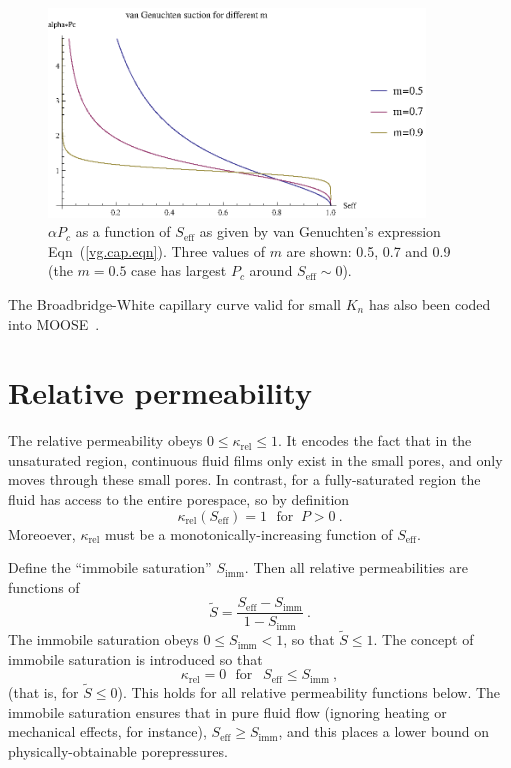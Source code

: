 \documentclass[]{scrreprt}
\begin{document}
\begin{figure}[htb]
\centering
\includegraphics[width=10cm]{van_genuchten_pc.eps}
\caption{$\alpha P_{c}$ as a function of $S_{\mathrm{eff}}$ as given
  by van Genuchten's expression Eqn~(\ref{vg.cap.eqn}).  Three values
  of $m$ are shown: 0.5, 0.7 and 0.9 (the $m=0.5$ case has largest
  $P_{c}$ around $S_{\mathrm{eff}}\sim 0$).}
\label{van_genuchten_pc.fig}
\end{figure}

The Broadbridge-White capillary curve valid for small $K_{n}$ has also been coded into MOOSE~\cite{bw1988}.

\section{Relative permeability}
\label{rel.perm.sec}

The relative permeability obeys $0\leq \kappa_{\mathrm{rel}} \leq 1$.
It encodes the fact that in the unsaturated region, continuous fluid
films only exist in the small pores, and only moves through these
small pores.  In contrast, for a fully-saturated region the fluid has
access to the entire porespace, so by definition
\begin{equation}
\kappa_{\mathrm{rel}}(S_{\mathrm{eff}}) = 1 \ \ \ \mbox{for }\  P>0
\ .
\label{full.sat.rel.perm.eqn}
\end{equation}
Moreoever, $\kappa_{\mathrm{rel}}$ must be a monotonically-increasing
function of $S_{\mathrm{eff}}$.

Define the ``immobile saturation'' $S_{\mathrm{imm}}$.  Then all
relative permeabilities are functions of
\begin{equation}
\tilde{S} = \frac{S_{\mathrm{eff}} -
  S_{\mathrm{imm}}}{1 - S_{\mathrm{imm}}} \ .
\end{equation}
The immobile saturation obeys $0\leq S_{\mathrm{imm}} < 1$, so that
$\tilde{S} \leq 1$.  The concept of immobile saturation
is introduced so that
\begin{equation}
\kappa_{\mathrm{rel}} = 0 \ \ \ \mbox{for }\ \ S_{\mathrm{eff}} \leq
S_{\mathrm{imm}} \ ,
\end{equation}
(that is, for $\tilde{S}\leq 0$).
This holds for all relative permeability functions below.  The
immobile saturation ensures that in pure fluid flow (ignoring heating
or mechanical effects, for instance), $S_{\mathrm{eff}}\geq
S_{\mathrm{imm}}$, and this places a lower bound on
physically-obtainable porepressures.
\end{document}
